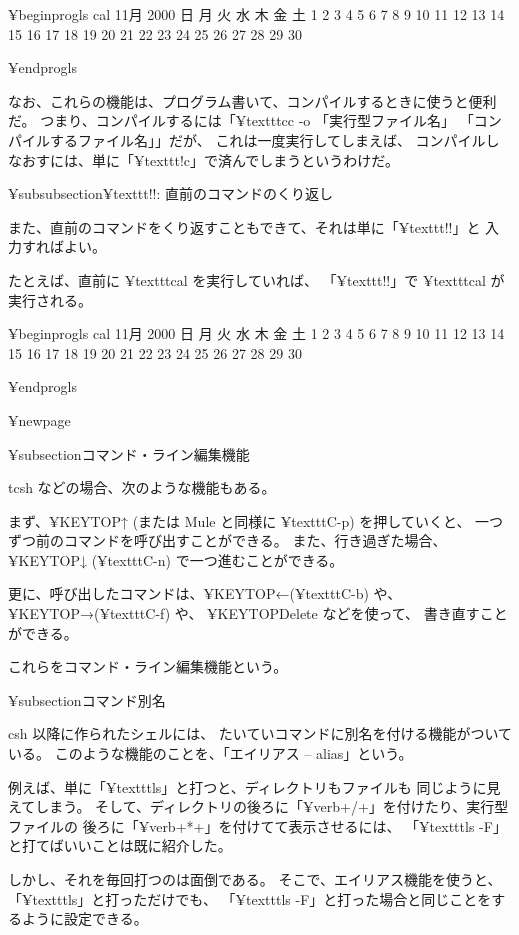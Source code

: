 ¥begin{progls}
cal
     11月 2000
日 月 火 水 木 金 土
          1  2  3  4
 5  6  7  8  9 10 11
12 13 14 15 16 17 18
19 20 21 22 23 24 25
26 27 28 29 30

%
¥end{progls}

なお、これらの機能は、プログラム書いて、コンパイルするときに使うと便利だ。
つまり、コンパイルするには「¥texttt{cc -o 「実行型ファイル名」 「コンパイルするファイル名」}」だが、
これは一度実行してしまえば、
コンパイルしなおすには、単に「¥texttt{!c}」で済んでしまうというわけだ。

¥subsubsection{¥texttt{!!}: 直前のコマンドのくり返し}

また、直前のコマンドをくり返すこともできて、それは単に「¥texttt{!!}」と
入力すればよい。

たとえば、直前に ¥texttt{cal} を実行していれば、
「¥texttt{!!}」で ¥texttt{cal} が実行される。

¥begin{progls}
cal
     11月 2000
日 月 火 水 木 金 土
          1  2  3  4
 5  6  7  8  9 10 11
12 13 14 15 16 17 18
19 20 21 22 23 24 25
26 27 28 29 30

%
¥end{progls}

¥newpage

¥subsection{コマンド・ライン編集機能}

tcsh などの場合、次のような機能もある。

まず、¥KEYTOP{↑} (または Mule と同様に ¥texttt{C-p}) を押していくと、
一つずつ前のコマンドを呼び出すことができる。
また、行き過ぎた場合、¥KEYTOP{↓} (¥texttt{C-n}) で一つ進むことができる。

更に、呼び出したコマンドは、¥KEYTOP{←}(¥texttt{C-b}) や、
¥KEYTOP{→}(¥texttt{C-f}) や、 ¥KEYTOP{Delete} などを使って、
書き直すことができる。

これらをコマンド・ライン編集機能という。

¥subsection{コマンド別名}

csh 以降に作られたシェルには、
たいていコマンドに別名を付ける機能がついている。
このような機能のことを、「エイリアス -- alias」という。

例えば、単に「¥texttt{ls}」と打つと、ディレクトリもファイルも
同じように見えてしまう。
そして、ディレクトリの後ろに「¥verb+/+」を付けたり、実行型ファイルの
後ろに「¥verb+*+」を付けてて表示させるには、
「¥texttt{ls -F}」と打てばいいことは既に紹介した。

しかし、それを毎回打つのは面倒である。
そこで、エイリアス機能を使うと、「¥texttt{ls}」と打っただけでも、
「¥texttt{ls -F}」と打った場合と同じことをするように設定できる。

